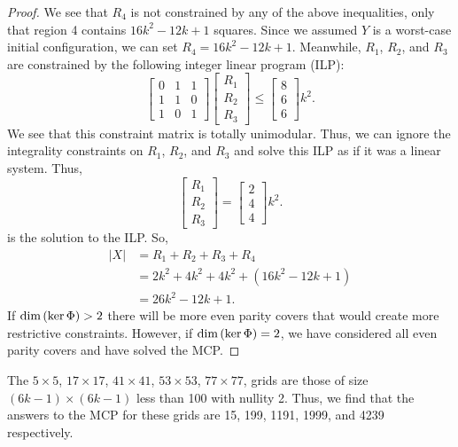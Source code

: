 \documentclass[a4paper]{article}
\newcommand{\abs}[1]{\left| #1 \right|}
\renewcommand{\dim}[1]{\textnormal{dim}\left( #1 \right)}
\begin{document}
\begin{proof}
		We see that $R_4$ is not constrained by any of the above inequalities, only that region 4 contains $16k^2 - 12k + 1$ squares.
		Since we assumed $Y$ is a worst-case initial configuration, we can set $R_4 = 16k^2 - 12k + 1$.
		Meanwhile, $R_1$, $R_2$, and $R_3$ are constrained by the following integer linear program (ILP):
		\begin{equation*}
			\begin{bmatrix}
				0 & 1 & 1 \\
				1 & 1 & 0 \\
				1 & 0 & 1 
			\end{bmatrix}
			\begin{bmatrix}
				R_1 \\
				R_2 \\
				R_3
			\end{bmatrix}
			\leq
			\begin{bmatrix}
				8 \\
				6 \\
				6
			\end{bmatrix}k^2.
		\end{equation*}
		We see that this constraint matrix is totally unimodular.
		Thus, we can ignore the integrality constraints on $R_1$, $R_2$, and $R_3$ and solve this ILP as if it was a linear system.
		Thus,
		\begin{equation*}
			\begin{bmatrix}
				R_1 \\
				R_2 \\
				R_3
			\end{bmatrix}
			=
			\begin{bmatrix}
				2 \\
				4 \\
				4
			\end{bmatrix}k^2.
		\end{equation*}
		is the solution to the ILP.
		So,
		\begin{align*}
			\abs{X} &=  R_1 + R_2 + R_3 + R_4 \\
				&= 2k^2 + 4k^2 +  4k^2 + (16k^2 - 12k + 1) \\
				&= 26k^2 - 12k + 1.
		\end{align*}
		If $\dim{\ker{\Phi}} > 2$ there will be more even parity covers that would create more restrictive constraints.
		However, if $\dim{\ker{\Phi}} = 2$, we have considered all even parity covers and have solved the MCP.
	\end{proof}

	The $5 \times 5$, $17 \times 17$, $41 \times 41$, $53 \times 53$, $77 \times 77$, grids are those of size $(6k-1) \times (6k-1)$ less than 100 with nullity 2.
	Thus, we find that the answers to the MCP for these grids are 15, 199, 1191, 1999, and 4239 respectively.
	
\end{document}

